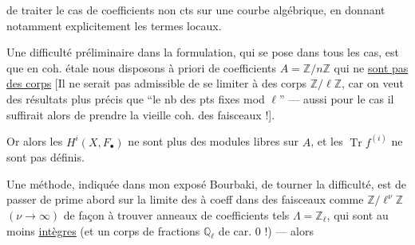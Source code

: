 de traiter le cas  de coefficients non cts sur une courbe algébrique, en donnant notamment explicitement les termes locaux.

Une  difficulté  préliminaire dans la formulation, qui se pose dans tous les cas, est que en coh. étale nous disposons à priori de coefficients $A=\mathbb Z/n\mathbb Z$  qui ne \uline{sont pas des corps} [Il ne serait pas admissible de se limiter à des corps  $\mathbb Z/\ell\mathbb Z$, car on veut des résultats plus précis que ``le nb des pts fixes mod $\ell$'' --- aussi pour le cas il suffirait alors de prendre la vieille coh. des faisceaux  !].

Or alors les $H^i(X,F_\bullet)$ ne sont plus des modules libres sur $A$, et les $\operatorname{Tr}f^{(i)}$ ne sont pas définis.

Une méthode, indiquée dans mon exposé Bourbaki, de tourner la difficulté, est de passer de prime abord sur la limite  des  à coeff dans des faisceaux comme $\mathbb Z/\ell^\nu\mathbb Z$ $(\nu\longrightarrow\infty)$ de façon à trouver    anneaux de coefficients tels $\Lambda=\mathbb Z_\ell$,  qui sont au moins \uline{intègres} (et  un corps de fractions $\mathbb Q_\ell$ de car. $0$ !) --- alors

